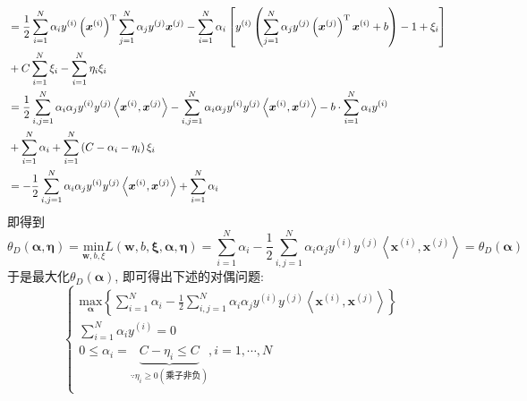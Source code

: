 \documentclass{article}
\begin{document}
\begin{homeworkProblem}
\begin{align}
		\\
		&=\frac{1}{2}\sum_{i=1}^N{\alpha _iy^{\left( i \right)}\left( \boldsymbol{x}^{\left( i \right)} \right) ^{\text{T}}}\sum_{j=1}^N{\alpha _jy^{\left( j \right)}\boldsymbol{x}^{\left( j \right)}}-\sum_{i=1}^N{\alpha _i\left[ y^{\left( i \right)}\left( \sum_{j=1}^N{\alpha _jy^{\left( j \right)}\left( \boldsymbol{x}^{\left( j \right)} \right) ^{\text{T}}\boldsymbol{x}^{\left( i \right)}}+b \right) -1+\xi _i \right]} \notag
		\\
		&+C\sum_{i=1}^N{\xi _i}-\sum_{i=1}^N{\eta _i\xi _i} \notag
		\\
		&=\frac{1}{2}\sum_{i,j=1}^N{\alpha _i\alpha _jy^{\left( i \right)}y^{\left( j \right)}\left< \boldsymbol{x}^{\left( i \right)},\boldsymbol{x}^{\left( j \right)} \right>}-\sum_{i,j=1}^N{\alpha _i\alpha _jy^{\left( i \right)}y^{\left( j \right)}\left< \boldsymbol{x}^{\left( i \right)},\boldsymbol{x}^{\left( j \right)} \right>} -b\cdot \sum_{i=1}^N{\alpha _iy^{\left( i \right)}} \notag
		\\
		&+\sum_{i=1}^N{\alpha _i}+\sum_{i=1}^N{\left( C-\alpha _i-\eta _i \right) \xi _i} \notag
		\\
		&=-\frac{1}{2}\sum_{i,j=1}^N{\alpha _i\alpha _jy^{\left( i \right)}y^{\left( j \right)}\left< \boldsymbol{x}^{\left( i \right)},\boldsymbol{x}^{\left( j \right)} \right>}+\sum_{i=1}^N{\alpha _i} \notag
	\end{align}
	即得到$$\theta _D\left( \boldsymbol{\alpha },\boldsymbol{\eta } \right) =\underset{\boldsymbol{w},b,\xi}{\text{min}}L\left( \boldsymbol{w},b,\boldsymbol{\xi },\boldsymbol{\alpha },\boldsymbol{\eta } \right) =\sum_{i=1}^N{\alpha _i}-\frac{1}{2}\sum_{i,j=1}^N{\alpha _i\alpha _jy^{\left( i \right)}y^{\left( j \right)}\left< \boldsymbol{x}^{\left( i \right)},\boldsymbol{x}^{\left( j \right)} \right>}=\theta _D\left( \boldsymbol{\alpha } \right) 
	$$
	于是最大化$\theta_D(\boldsymbol{\alpha})$, 即可得出下述的对偶问题:
	$$
	\begin{cases}
		\displaystyle \underset{\boldsymbol{\alpha }}{\text{max}}\left\{ \sum_{i=1}^N{\alpha _i}-\frac{1}{2}\sum_{i,j=1}^N{\alpha _i\alpha _jy^{\left( i \right)}y^{\left( j \right)}\left< \boldsymbol{x}^{\left( i \right)},\boldsymbol{x}^{\left( j \right)} \right>} \right\}\\
		\displaystyle \sum_{i=1}^N{\alpha _iy^{\left( i \right)}}=0\\
		0\le \alpha _i=\underset{\because \eta _i\ge 0\left( \text{乘子非负} \right)}{\underbrace{C-\eta _i\le C}},i=1,\cdots ,N\\

\end{cases}$$
\end{homeworkProblem}
\end{document}
